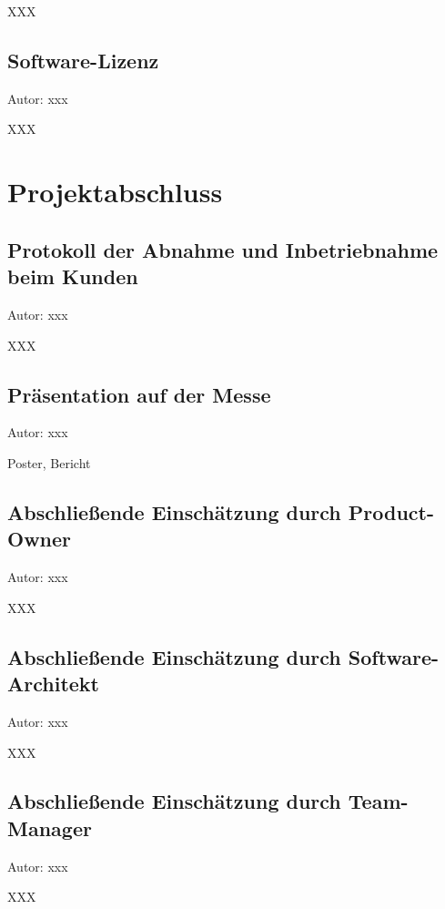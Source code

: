 \documentclass[twoside]{report}
\begin{document}
XXX

\subsection{Software-Lizenz}
{\small Autor: xxx}

XXX


\section{Projektabschluss}

\subsection{Protokoll der Abnahme und Inbetriebnahme beim Kunden}
{\small Autor: xxx}

XXX

\subsection{Präsentation auf der Messe}
{\small Autor: xxx}

Poster, Bericht

\subsection{Abschließende Einschätzung durch Product-Owner}
{\small Autor: xxx}

XXX

\subsection{Abschließende Einschätzung durch Software-Architekt}
{\small Autor: xxx}

XXX

\subsection{Abschließende Einschätzung durch Team-Manager}
{\small Autor: xxx}

XXX
\end{document}
